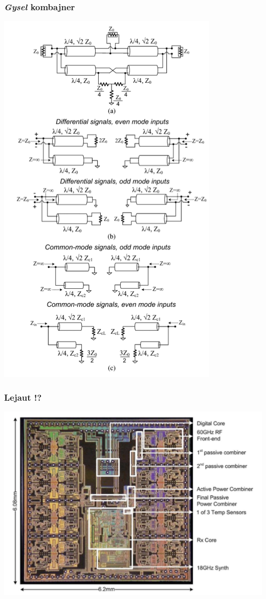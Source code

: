 \documentclass{beamer}
\begin{document}
\begin{frame}
\frametitle{\textit{Gysel} kombajner}
  \includegraphics[width=0.45\linewidth]{Gysel-power-combiner.png}
\end{frame}


\begin{frame}
\frametitle{Lejaut !?}
  \includegraphics[width=\linewidth]{layout60GHz-IBM.png}
\end{frame}





\end{document}
